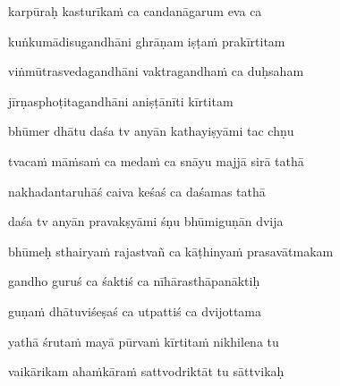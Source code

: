karpūraḥ kasturīka\.m ca candanāgarum eva ca\thinspace{\dandab} \dontdisplaylinenum

kuṅkumādisugandhāni ghrāṇam iṣṭa\.m prakīrtitam \veg\dontdisplaylinenum

viṅmūtrasvedagandhāni vaktragandha\.m ca duḥsaham\thinspace{\dandab} \dontdisplaylinenum

jīrṇasphoṭitagandhāni aniṣṭānīti kīrtitam \veg\dontdisplaylinenum

bhūmer dhātu daśa tv anyān kathayiṣyāmi tac chṇu\thinspace{\dandab} \dontdisplaylinenum

tvaca\.m mā\.msa\.m ca meda\.m ca snāyu majjā sirā tathā \veg\dontdisplaylinenum

nakhadantaruhāś caiva keśaś ca daśamas tathā\thinspace{\dandab} \dontdisplaylinenum

daśa tv anyān pravakṣyāmi śṇu bhūmiguṇān dvija \veg\dontdisplaylinenum

bhūmeḥ sthairya\.m rajastvañ ca kāṭhinya\.m prasavātmakam\thinspace{\dandab} \dontdisplaylinenum

gandho guruś ca śaktiś ca nīhārasthāpanāktiḥ \veg\dontdisplaylinenum

guṇa\.m dhātuviśeṣaś ca utpattiś ca dvijottama\thinspace{\dandab} \dontdisplaylinenum

yathā śruta\.m mayā pūrva\.m kīrtita\.m nikhilena tu \veg\dontdisplaylinenum


vaikārikam aha\.mkāra\.m sattvodriktāt tu sāttvikaḥ\thinspace{\dandab} \dontdisplaylinenum

